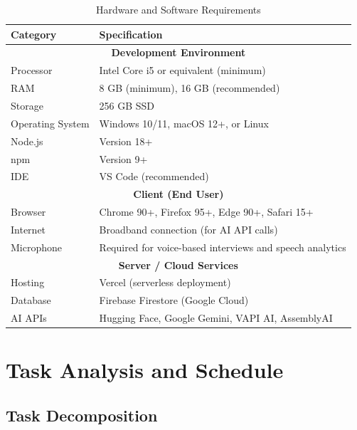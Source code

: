 \documentclass[12pt,a4paper,oneside]{report}
\begin{document}
\begin{table}[H]
\centering
\caption{Hardware and Software Requirements}
\label{tab:requirements}
\begin{tabular}{|p{4cm}|p{9cm}|}
\hline
\textbf{Category} & \textbf{Specification} \\
\hline
\multicolumn{2}{|c|}{\textbf{Development Environment}} \\
\hline
Processor & Intel Core i5 or equivalent (minimum) \\
\hline
RAM & 8 GB (minimum), 16 GB (recommended) \\
\hline
Storage & 256 GB SSD \\
\hline
Operating System & Windows 10/11, macOS 12+, or Linux \\
\hline
Node.js & Version 18+ \\
\hline
npm & Version 9+ \\
\hline
IDE & VS Code (recommended) \\
\hline
\multicolumn{2}{|c|}{\textbf{Client (End User)}} \\
\hline
Browser & Chrome 90+, Firefox 95+, Edge 90+, Safari 15+ \\
\hline
Internet & Broadband connection (for AI API calls) \\
\hline
Microphone & Required for voice-based interviews and speech analytics \\
\hline
\multicolumn{2}{|c|}{\textbf{Server / Cloud Services}} \\
\hline
Hosting & Vercel (serverless deployment) \\
\hline
Database & Firebase Firestore (Google Cloud) \\
\hline
AI APIs & Hugging Face, Google Gemini, VAPI AI, AssemblyAI \\
\hline
\end{tabular}
\end{table}


\chapter{Task Analysis and Schedule}
\label{ch:task_analysis}

\section{Task Decomposition}
\label{sec:task_decomp}
\end{document}

